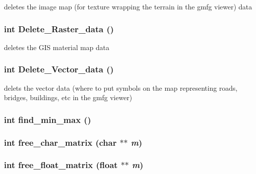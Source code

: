 deletes the image map (for texture wrapping the terrain in the gmfg viewer) data 

\hypertarget{GisApi_8C_a37}{
\subsubsection[Delete\_\-Raster\_\-data]{\setlength{\rightskip}{0pt plus 5cm}int Delete\_\-Raster\_\-data ()}}
\label{GisApi_8C_a37}


deletes the GIS material map data 

\hypertarget{GisApi_8C_a25}{
\subsubsection[Delete\_\-Vector\_\-data]{\setlength{\rightskip}{0pt plus 5cm}int Delete\_\-Vector\_\-data ()}}
\label{GisApi_8C_a25}


delets the vector data (where to put symbols on the map representing roads, bridges, buildings, etc in the gmfg viewer) 

\hypertarget{GisApi_8C_a23}{
\subsubsection[find\_\-min\_\-max]{\setlength{\rightskip}{0pt plus 5cm}int find\_\-min\_\-max ()}}
\label{GisApi_8C_a23}


\hypertarget{GisApi_8C_a14}{
\subsubsection[free\_\-char\_\-matrix]{\setlength{\rightskip}{0pt plus 5cm}int free\_\-char\_\-matrix (char $\ast$$\ast$ {\em m})}}
\label{GisApi_8C_a14}


\hypertarget{GisApi_8C_a15}{
\subsubsection[free\_\-float\_\-matrix]{\setlength{\rightskip}{0pt plus 5cm}int free\_\-float\_\-matrix (float $\ast$$\ast$ {\em m})}}
\label{GisApi_8C_a15}


